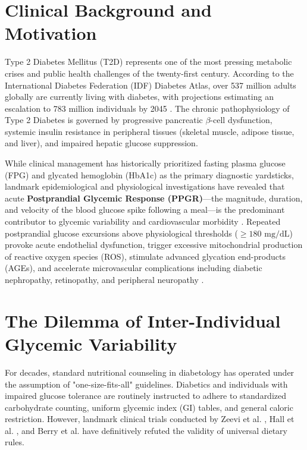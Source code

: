 \label{chap:introduction}

\section{Clinical Background and Motivation}
Type 2 Diabetes Mellitus (T2D) represents one of the most pressing metabolic crises and public health challenges of the twenty-first century. According to the International Diabetes Federation (IDF) Diabetes Atlas, over 537 million adults globally are currently living with diabetes, with projections estimating an escalation to 783 million individuals by 2045 \cite{idf2021}. The chronic pathophysiology of Type 2 Diabetes is governed by progressive pancreatic $\beta$-cell dysfunction, systemic insulin resistance in peripheral tissues (skeletal muscle, adipose tissue, and liver), and impaired hepatic glucose suppression. 

While clinical management has historically prioritized fasting plasma glucose (FPG) and glycated hemoglobin (HbA1c) as the primary diagnostic yardsticks, landmark epidemiological and physiological investigations have revealed that acute \textbf{Postprandial Glycemic Response (PPGR)}—the magnitude, duration, and velocity of the blood glucose spike following a meal—is the predominant contributor to glycemic variability and cardiovascular morbidity \cite{brownlee2005pathobiology}. Repeated postprandial glucose excursions above physiological thresholds ($\ge 180\text{ mg/dL}$) provoke acute endothelial dysfunction, trigger excessive mitochondrial production of reactive oxygen species (ROS), stimulate advanced glycation end-products (AGEs), and accelerate microvascular complications including diabetic nephropathy, retinopathy, and peripheral neuropathy \cite{brownlee2005pathobiology}.

\section{The Dilemma of Inter-Individual Glycemic Variability}
For decades, standard nutritional counseling in diabetology has operated under the assumption of "one-size-fits-all" guidelines. Diabetics and individuals with impaired glucose tolerance are routinely instructed to adhere to standardized carbohydrate counting, uniform glycemic index (GI) tables, and general caloric restriction. However, landmark clinical trials conducted by Zeevi et al. \cite{zeevi2015personalized}, Hall et al. \cite{hall2018glucotypes}, and Berry et al. \cite{berry2020human} have definitively refuted the validity of universal dietary rules.

